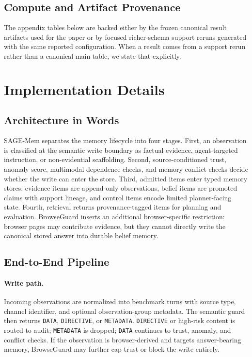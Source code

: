 \documentclass{article}
\begin{document}
\subsection{Compute and Artifact Provenance}

The appendix tables below are backed either by the frozen canonical result artifacts used for the paper or by focused richer-schema support reruns generated with the same reported configuration. When a result comes from a support rerun rather than a canonical main table, we state that explicitly.

\section{Implementation Details}

\subsection{Architecture in Words}

SAGE-Mem separates the memory lifecycle into four stages. First, an observation is classified at the semantic write boundary as factual evidence, agent-targeted instruction, or non-evidential scaffolding. Second, source-conditioned trust, anomaly score, multimodal dependence checks, and memory conflict checks decide whether the write can enter the store. Third, admitted items enter typed memory stores: evidence items are append-only observations, belief items are promoted claims with support lineage, and control items encode limited planner-facing state. Fourth, retrieval returns provenance-tagged items for planning and evaluation. BrowseGuard inserts an additional browser-specific restriction: browser pages may contribute evidence, but they cannot directly write the canonical stored answer into durable belief memory.

\subsection{End-to-End Pipeline}

\paragraph{Write path.}
Incoming observations are normalized into benchmark turns with source type, channel identifier, and optional observation-group metadata. The semantic guard then returns \texttt{DATA}, \texttt{DIRECTIVE}, or \texttt{METADATA}. \texttt{DIRECTIVE} or high-risk content is routed to audit; \texttt{METADATA} is dropped; \texttt{DATA} continues to trust, anomaly, and conflict checks. If the observation is browser-derived and targets answer-bearing memory, BrowseGuard may further cap trust or block the write entirely.
\end{document}

